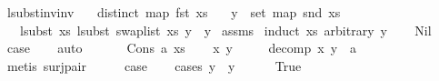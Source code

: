 \begin{isabellebody}
\endisatagproof
{\isafoldproof}%
%
\isadelimproof
\isanewline
%
\endisadelimproof
\isanewline
\isanewline
{}\isamarkupfalse%
\ lsubst{\isacharunderscore}{\kern0pt}inv{\isacharunderscore}{\kern0pt}inv{\isacharcolon}{\kern0pt}\isanewline
\ \ \ {\isachardoublequoteopen}distinct\ {\isacharparenleft}{\kern0pt}map\ fst\ xs{\isacharparenright}{\kern0pt}{\isachardoublequoteclose}\isanewline
\ \ \ {\isachardoublequoteopen}y\ {\isasymin}\ set\ {\isacharparenleft}{\kern0pt}map\ snd\ xs{\isacharparenright}{\kern0pt}{\isachardoublequoteclose}\isanewline
\ \ \ {\isachardoublequoteopen}lsubst\ xs\ {\isacharparenleft}{\kern0pt}lsubst\ {\isacharparenleft}{\kern0pt}swap{\isacharunderscore}{\kern0pt}list\ xs{\isacharparenright}{\kern0pt}\ y{\isacharparenright}{\kern0pt}\ {\isacharequal}{\kern0pt}\ y{\isachardoublequoteclose}\isanewline
%
\isadelimproof
%
\endisadelimproof
%
\isatagproof
{}\isamarkupfalse%
\ assms\isanewline
{}\isamarkupfalse%
\ {\isacharparenleft}{\kern0pt}induct\ xs\ arbitrary{\isacharcolon}{\kern0pt}\ y{\isacharparenright}{\kern0pt}\isanewline
\ \ \isamarkupfalse%
\ Nil\isanewline
\ \ \isamarkupfalse%
\ \isamarkupfalse%
\ {\isacharquery}{\kern0pt}case\isanewline
\ \ \isamarkupfalse%
\ auto\isanewline
\ \ \isamarkupfalse%
\isanewline
{}\isamarkupfalse%
\isanewline
\ \ \isamarkupfalse%
\ {\isacharparenleft}{\kern0pt}Cons\ a\ xs{\isacharparenright}{\kern0pt}\isanewline
\ \ \isamarkupfalse%
\ x\ y{\isacharprime}{\kern0pt}\ \isanewline
\ \ \ \ decomp{\isacharcolon}{\kern0pt}\ {\isachardoublequoteopen}{\isacharparenleft}{\kern0pt}x{\isacharcomma}{\kern0pt}\ y{\isacharprime}{\kern0pt}{\isacharparenright}{\kern0pt}\ {\isacharequal}{\kern0pt}\ a{\isachardoublequoteclose}\isanewline
\ \ \isamarkupfalse%
\ {\isacharparenleft}{\kern0pt}metis\ surj{\isacharunderscore}{\kern0pt}pair{\isacharparenright}{\kern0pt}\isanewline
\isanewline
\ \ \isamarkupfalse%
\ \isamarkupfalse%
\ {\isacharquery}{\kern0pt}case\isanewline
\ \ \isamarkupfalse%
\ {\isacharparenleft}{\kern0pt}cases\ {\isachardoublequoteopen}y\ {\isacharequal}{\kern0pt}\ y{\isacharprime}{\kern0pt}{\isachardoublequoteclose}{\isacharparenright}{\kern0pt}\isanewline
\ \ \ \ \isamarkupfalse%
\ True\isanewline

\end{isabellebody}
